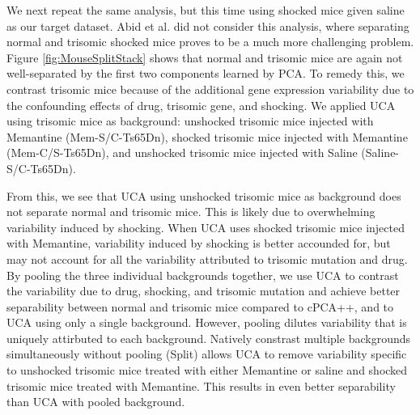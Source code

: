 \documentclass[12pt]{article}
\begin{document}
We next repeat the same analysis, but this time using shocked mice given saline as our target dataset. Abid et al. \cite{Abid} did not consider this analysis, where separating normal and trisomic shocked mice proves to be a much more challenging problem. Figure \ref{fig:MouseSplitStack} shows that normal and trisomic mice are again not well-separated by the first two components learned by PCA.
To remedy this, we contrast trisomic mice because of the additional gene expression variability due to the confounding effects of drug, trisomic gene, and shocking. We applied UCA using trisomic mice as background: unshocked trisomic mice injected with Memantine (Mem-S/C-Ts65Dn), shocked trisomic mice injected with Memantine (Mem-C/S-Ts65Dn), and unshocked trisomic mice injected with Saline (Saline-S/C-Ts65Dn). 

From this, we see that UCA using unshocked trisomic mice as background does not separate normal and trisomic mice. This is likely due to overwhelming variability induced by shocking. When UCA uses shocked trisomic mice injected with Memantine, variability induced by shocking is better accounded for, but may not account for all the variability attributed to trisomic mutation and drug.
 By pooling the three individual backgrounds together, we use UCA to contrast the variability due to drug, shocking, and trisomic mutation and achieve better separability between normal and trisomic mice compared to cPCA++, and to UCA using only a single background. However, pooling dilutes variability that is uniquely attirbuted to each background.
 Natively constrast multiple backgrounds simultaneously without pooling (Split) allows UCA to remove variability specific to unshocked trisomic mice treated with either Memantine or saline and shocked trisomic mice treated with Memantine. This results in even better separability than UCA with pooled background.







\end{document}
